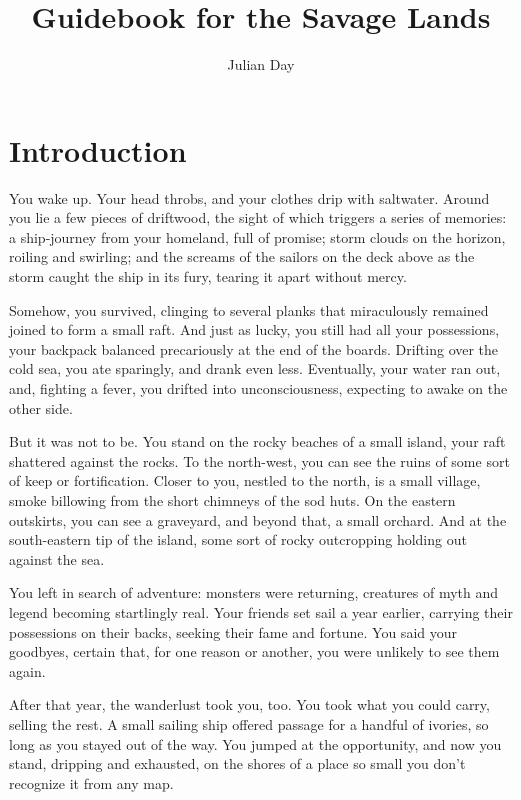 \documentclass{article}
\begin{document}
\title{Guidebook for the Savage Lands}
\author{Julian Day}
\maketitle
\thispagestyle{empty}

\newpage
\clearpage
\thispagestyle{empty}

\tableofcontents

\newpage
\setcounter{page}{1}

\section{Introduction}

You wake up.  Your head throbs, and your clothes drip with saltwater. 
Around you lie a few pieces of driftwood, the sight of which triggers
a series of memories: a ship-journey from your homeland, full of promise;
storm clouds on the horizon, roiling and swirling; and the screams of the
sailors on the deck above as the storm caught the ship in its fury, tearing
it apart without mercy.

Somehow, you survived, clinging to several planks that miraculously
remained joined to form a small raft. And just as lucky, you still had all
your possessions, your backpack balanced precariously at the end of the
boards.  Drifting over the cold sea, you ate sparingly, and drank even
less.  Eventually, your water ran out, and, fighting a fever, you drifted
into unconsciousness, expecting to awake on the other side.

But it was not to be.  You stand on the rocky beaches of a small island,
your raft shattered against the rocks.  To the north-west, you can see the 
ruins of some sort of keep or fortification.  Closer to you, nestled to the
north, is a small village, smoke billowing from the short chimneys of the 
sod huts.  On the eastern outskirts, you can see a graveyard, and beyond 
that, a small orchard.  And at the south-eastern tip of the island, some 
sort of rocky outcropping holding out against the sea.
 
You left in search of adventure: monsters were returning, creatures of myth
and legend becoming startlingly real.  Your friends set sail a year
earlier, carrying their possessions on their backs, seeking their fame and
fortune.  You said your goodbyes, certain that, for one reason or another,
you were unlikely to see them again.

After that year, the wanderlust took you, too.  You took what you could
carry, selling the rest.  A small sailing ship offered passage for a 
handful of ivories, so long as you stayed out of the way.  You
jumped at the opportunity, and now you stand, dripping and exhausted, on the
shores of a place so small you don't recognize it from any map.
\end{document}
